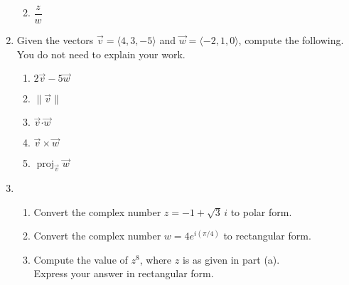 \documentclass[12pt]{article}
\newcommand{\points}[1]{\marginpar{\hspace{24pt}[#1]}}
\newcommand{\dotp}{\boldsymbol{\cdot}}
\newcommand{\len}[1]{\lVert #1\rVert}
\begin{document}
\begin{enumerate}
\begin{enumerate}
\vspace{1.25in}

\item $\dfrac{z}{w}$ \points{3}


\end{enumerate}

\newpage

\item Given the vectors $\vec{v} = \langle 4,3,-5\rangle$ and $\vec{w} = \langle -2,1,0\rangle$, compute the following. You do not need to explain your work.
\begin{enumerate}
 \item $2\vec{v}-5\vec{w}$  \points{2}

\vspace{1in}
  
 \item $\len{\vec{v}}$ \points{2}

\vspace{1in}

 \item $\vec{v}\dotp\vec{w}$ \points{2}

\vspace{1in}

 \item $\vec{v}\times \vec{w}$ \points{3}

\vspace{2.5in}

 \item $\operatorname{proj}_{\vec{v}}\vec{w}$ \points{3}
\end{enumerate}
\newpage



 \item \begin{enumerate}
\item Convert the complex number $z=-1+\sqrt{3}\,i$ to polar form. \points{3}

\vspace{2in}

\item Convert the complex number $w=4e^{i(\pi/4)}$ to rectangular form. \points{2}

\vspace{1.5in}

 \item Compute the value of $z^8$, where $z$ is as given in part (a).\points{4}\\
 Express your answer in rectangular form. 

\vspace{2.25in}


\end{enumerate}
\end{enumerate}
\end{document}
